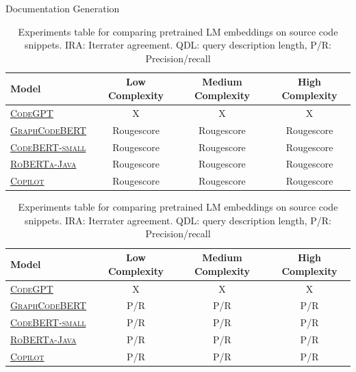 \documentclass[sigconf,review,anonymous]{acmart}
\begin{document}
  Documentation Generation
    {
    \renewcommand{\arraystretch}{1.5}
    \begin{table}[H]
      \small
      \begin{tabular}{l|ccc}
        Model & Low Complexity & Medium Complexity & High Complexity \\
        \hline
        \href{https://huggingface.co/microsoft/CodeGPT-small-java}{\textsc{CodeGPT}}~\citep{lu2021codexglue} & X & X & X \\
        \href{https://huggingface.co/microsoft/graphcodebert-base}{\textsc{GraphCodeBERT}}~\citep{guo2021graphcodebert} & Rougescore & Rougescore & Rougescore \\
        \href{https://huggingface.co/huggingface/CodeBERTa-small-v1a}{\textsc{CodeBERT-small}}~\citep{feng2020codebert} & Rougescore & Rougescore & Rougescore \\
        \href{https://huggingface.co/dbernsohn/roberta-java}{\textsc{RoBERTa-Java}}~\citep{liu2019roberta} & Rougescore & Rougescore & Rougescore \\
        \href{https://copilot.github.com/}{\textsc{Copilot}}\citep{chen2021evaluating} & Rougescore & Rougescore & Rougescore \\

      \end{tabular}
      \caption{\label{tab:doc_synthesis} Experiments table for comparing pretrained LM embeddings on source code snippets. IRA: Iterrater agreement. QDL: query description length, P/R: Precision/recall}
    \end{table}
  }

    {
    \renewcommand{\arraystretch}{1.5}
    \begin{table}[H]
      \small
      \begin{tabular}{l|ccc}
        Model & Low Complexity & Medium Complexity & High Complexity \\
        \hline
        \href{https://huggingface.co/microsoft/CodeGPT-small-java}{\textsc{CodeGPT}}~\citep{lu2021codexglue} & X & X & X \\
        \href{https://huggingface.co/microsoft/graphcodebert-base}{\textsc{GraphCodeBERT}}~\citep{guo2021graphcodebert} & P/R & P/R & P/R \\
        \href{https://huggingface.co/huggingface/CodeBERTa-small-v1a}{\textsc{CodeBERT-small}}~\citep{feng2020codebert} & P/R & P/R & P/R \\
        \href{https://huggingface.co/dbernsohn/roberta-java}{\textsc{RoBERTa-Java}}~\citep{liu2019roberta} & P/R & P/R & P/R \\
        \href{https://copilot.github.com/}{\textsc{Copilot}}\citep{chen2021evaluating} & P/R & P/R & P/R \\

      \end{tabular}
      \caption{\label{tab:code_completion} Experiments table for comparing pretrained LM embeddings on source code snippets. IRA: Iterrater agreement. QDL: query description length, P/R: Precision/recall}
    \end{table}
  }
\end{document}

